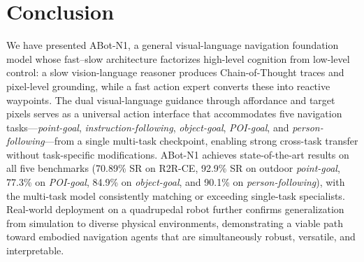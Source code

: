 \section{Conclusion}
\label{sec:conclusion}

We have presented ABot-N1, a general visual-language navigation foundation model whose fast--slow architecture factorizes high-level cognition from low-level control: a slow vision-language reasoner produces Chain-of-Thought traces and pixel-level grounding, while a fast action expert converts these into reactive  waypoints. The dual visual-language guidance through affordance and target pixels serves as a universal action interface that accommodates five navigation tasks---\textit{point-goal}, \textit{instruction-following}, \textit{object-goal}, \textit{POI-goal}, and \textit{person-following}---from a single multi-task checkpoint, enabling strong cross-task transfer without task-specific modifications. ABot-N1 achieves state-of-the-art results on all five benchmarks (70.89\% SR on R2R-CE, 92.9\% SR on outdoor \textit{point-goal}, 77.3\% on \textit{POI-goal}, 84.9\% on \textit{object-goal}, and 90.1\% on \textit{person-following}), with the multi-task model consistently matching or exceeding single-task specialists. Real-world deployment on a quadrupedal robot further confirms generalization from simulation to diverse physical environments, demonstrating a viable path toward embodied navigation agents that are simultaneously robust, versatile, and interpretable.

